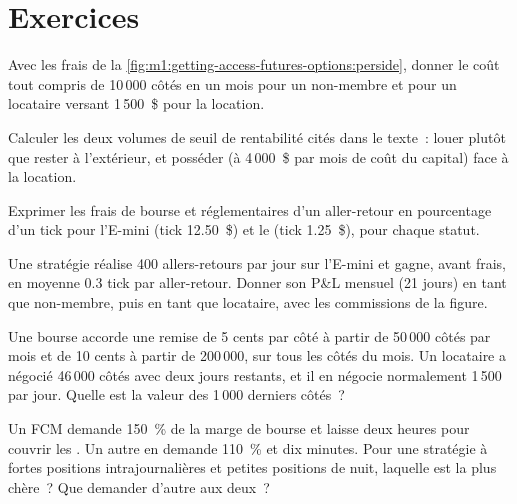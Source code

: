 \section{Exercices}

\begin{exercise}[$\star$]\label{exo:m1:getting-access-futures-options:1}
Avec les frais de la \cref{fig:m1:getting-access-futures-options:perside}, donner
le coût tout compris de 10\,000 côtés en un mois pour un non-membre et pour un
locataire versant 1\,500~\$ pour la location.
\end{exercise}

\begin{exercise}[$\star$]\label{exo:m1:getting-access-futures-options:2}
Calculer les deux volumes de seuil de rentabilité cités dans le texte~: louer
plutôt que rester à l'extérieur, et posséder (à 4\,000~\$ par mois de coût du capital) face à
la location.
\end{exercise}

\begin{exercise}[$\star$]\label{exo:m1:getting-access-futures-options:3}
Exprimer les frais de bourse et réglementaires d'un aller-retour en pourcentage
d'un tick pour l'E-mini (tick 12.50~\$) et le  (tick 1.25~\$), pour
chaque statut.
\end{exercise}

\begin{exercise}[$\star\star$]\label{exo:m1:getting-access-futures-options:4}
Une stratégie réalise 400 allers-retours par jour sur l'E-mini et gagne, avant frais,
en moyenne 0.3 tick par aller-retour. Donner son P\&L mensuel (21 jours) en tant
que non-membre, puis en tant que locataire, avec les commissions de la figure.
\end{exercise}

\begin{exercise}[$\star\star$]\label{exo:m1:getting-access-futures-options:5}
Une bourse accorde une remise de 5 cents par côté à partir de 50\,000 côtés par mois et de 10
cents à partir de 200\,000, sur tous les côtés du mois. Un locataire a négocié 46\,000
côtés avec deux jours restants, et il en négocie normalement 1\,500 par jour. Quelle est
la valeur des 1\,000 derniers côtés~?
\end{exercise}

\begin{exercise}[$\star\star$]\label{exo:m1:getting-access-futures-options:6}
Un FCM demande 150~\% de la marge de bourse et laisse deux heures pour couvrir les
. Un autre en demande 110~\% et dix minutes. Pour une stratégie
à fortes positions intrajournalières et petites positions de nuit, laquelle est la plus chère~? Que
demander d'autre aux deux~?
\end{exercise}

